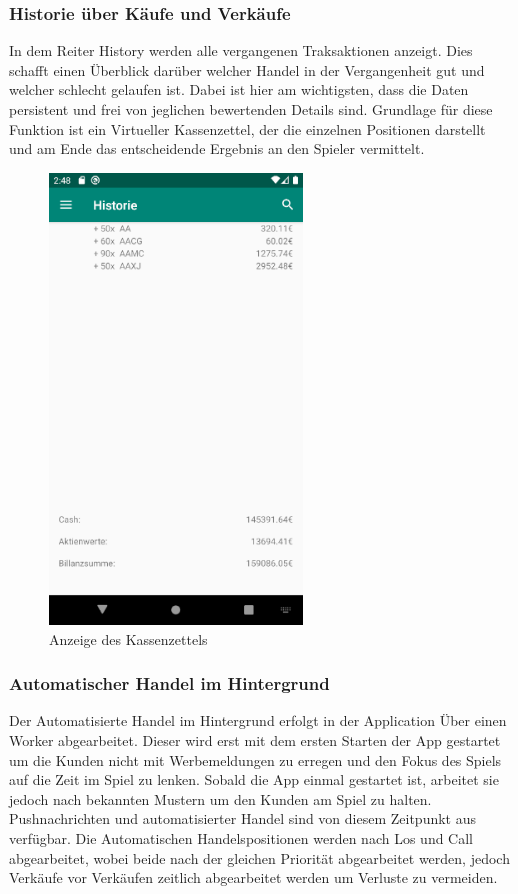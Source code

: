\documentclass[10pt]{scrartcl}
\begin{document}
\subsubsection{Historie über Käufe und Verkäufe}

In dem Reiter History werden alle vergangenen Traksaktionen anzeigt. Dies schafft einen Überblick darüber welcher Handel in der Vergangenheit gut und welcher schlecht gelaufen ist. Dabei ist hier am wichtigsten, dass die Daten persistent und frei von jeglichen bewertenden Details sind. Grundlage für diese Funktion ist ein Virtueller Kassenzettel, der die einzelnen Positionen darstellt und am Ende das entscheidende Ergebnis an den Spieler vermittelt.

\begin{figure}[H]
	\centering
	\includegraphics[width=0.6\textwidth]{Bilder/Prsi/kassenzettel.png}
	\caption{Anzeige des Kassenzettels}
\end{figure}

\subsubsection{Automatischer Handel im Hintergrund}

Der Automatisierte Handel im Hintergrund erfolgt in der Application Über einen Worker abgearbeitet. Dieser wird erst mit dem ersten Starten der App gestartet um die Kunden nicht mit Werbemeldungen zu erregen und den Fokus des Spiels auf die Zeit im Spiel zu lenken. Sobald die App einmal gestartet ist, arbeitet sie jedoch nach bekannten Mustern um den Kunden am Spiel zu halten. Pushnachrichten und automatisierter Handel sind von diesem Zeitpunkt aus verfügbar. Die Automatischen Handelspositionen werden nach Los und Call abgearbeitet, wobei beide nach der gleichen Priorität abgearbeitet werden, jedoch Verkäufe vor Verkäufen zeitlich abgearbeitet werden um Verluste zu vermeiden.
\end{document}

